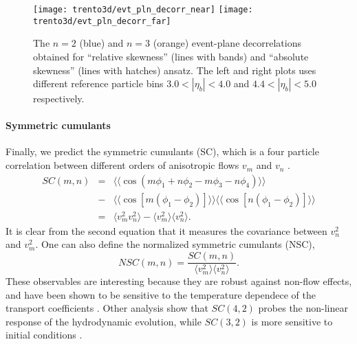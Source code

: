 \begin{figure}
\centering
\texttt{[image: trento3d/evt\_pln\_decorr\_near]}
\hfill
\texttt{[image: trento3d/evt\_pln\_decorr\_far]}
\caption{The $n=2$ (blue) and $n=3$ (orange) event-plane decorrelations obtained for ``relative skewness'' (lines with bands) and ``absolute skewness'' (lines with hatches) ansatz. The left and right plots uses different reference particle bins $3.0<|\eta_b|<4.0$ and $4.4<|\eta_b|<5.0$ respectively.}
\label{fig:trento:epd}
\end{figure}

\paragraph{Symmetric cumulants} Finally, we predict the symmetric cumulants (SC), which is a four particle correlation between different orders of anisotropic flows $v_m$ and $v_n$ \cite{Niemi:2012aj,Bilandzic:2013kga}.
\begin{eqnarray}
SC(m, n) &=& \langle\langle \cos(m\phi_1+n\phi_2-m\phi_3-n\phi_4)\rangle\rangle \nonumber \\
\nonumber &-& \langle\langle\cos[m(\phi_1-\phi_2)]\rangle\rangle\langle\langle\cos[n(\phi_1-\phi_2)]\rangle\rangle \label{eq:scmn}\\
&=& \langle v_m^2 v_n^2 \rangle - \langle v_m^2\rangle\langle v_n^2\rangle.
\end{eqnarray}
It is clear from the second equation that it measures the covariance between $v_n^2$ and $v_m^2$.
One can also define the normalized symmetric cumulants (NSC),
\begin{equation}
NSC(m,n) = \frac{SC(m,n)}{\langle v_m^2\rangle\langle v_n^2\rangle}.
\end{equation}
These observables are interesting because they are robust against non-flow effects, and have been shown to be sensitive to the temperature dependece of the transport coefficients \cite{ALICE:2016kpq}.
Other analysis show that $SC(4,2)$ probes the non-linear response of the hydrodynamic evolution, while $SC(3,2)$ is more sensitive to initial conditions \cite{Zhu:2016puf}.



